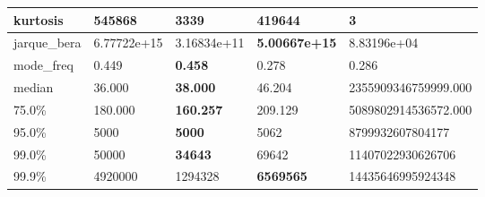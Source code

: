 \begin{table}[H]
\begin{tabular}{|l|m{10em}|m{10em}|m{10em}|m{10em}|}
\hline kurtosis & 545868 & 3339 & \bfseries 419644 & \cellcolor[rgb]{0.9, 0.54, 0.52} 3 \\
\hline jarque\_bera & 6.77722e+15 & 3.16834e+11 & \bfseries 5.00667e+15 & \cellcolor[rgb]{0.9, 0.54, 0.52} 8.83196e+04 \\
\hline mode\_freq & 0.449 & \bfseries 0.458 & \cellcolor[rgb]{0.9, 0.54, 0.52} 0.278 & 0.286 \\
\hline median & 36.000 & \bfseries 38.000 & 46.204 & \cellcolor[rgb]{0.9, 0.54, 0.52} 2355909346759999.000 \\
\hline 75.0\% & 180.000 & \bfseries 160.257 & 209.129 & \cellcolor[rgb]{0.9, 0.54, 0.52} 5089802914536572.000 \\
\hline 95.0\% & 5000 & \bfseries 5000 & 5062 & \cellcolor[rgb]{0.9, 0.54, 0.52} 8799932607804177 \\
\hline 99.0\% & 50000 & \bfseries 34643 & 69642 & \cellcolor[rgb]{0.9, 0.54, 0.52} 11407022930626706 \\
\hline 99.9\% & 4920000 & 1294328 & \bfseries 6569565 & \cellcolor[rgb]{0.9, 0.54, 0.52} 14435646995924348 \\
\hline
\end{tabular}
\end{table}

